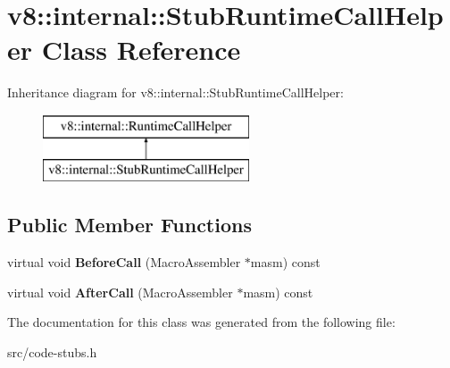 \hypertarget{classv8_1_1internal_1_1_stub_runtime_call_helper}{}\section{v8\+:\+:internal\+:\+:Stub\+Runtime\+Call\+Helper Class Reference}
\label{classv8_1_1internal_1_1_stub_runtime_call_helper}
Inheritance diagram for v8\+:\+:internal\+:\+:Stub\+Runtime\+Call\+Helper\+:\begin{figure}[H]
\begin{center}
\leavevmode
\includegraphics[height=2.000000cm]{classv8_1_1internal_1_1_stub_runtime_call_helper}
\end{center}
\end{figure}
\subsection*{Public Member Functions}
\begin{DoxyCompactItemize}
\item 
\hypertarget{classv8_1_1internal_1_1_stub_runtime_call_helper_ae27de3cf4368d853f074091df5ac2fd3}{}virtual void {\bfseries Before\+Call} (Macro\+Assembler $\ast$masm) const \label{classv8_1_1internal_1_1_stub_runtime_call_helper_ae27de3cf4368d853f074091df5ac2fd3}

\item 
\hypertarget{classv8_1_1internal_1_1_stub_runtime_call_helper_adb2d903c942ac0dbff3d084109fe0aa3}{}virtual void {\bfseries After\+Call} (Macro\+Assembler $\ast$masm) const \label{classv8_1_1internal_1_1_stub_runtime_call_helper_adb2d903c942ac0dbff3d084109fe0aa3}

\end{DoxyCompactItemize}


The documentation for this class was generated from the following file\+:\begin{DoxyCompactItemize}
\item 
src/code-\/stubs.\+h\end{DoxyCompactItemize}
